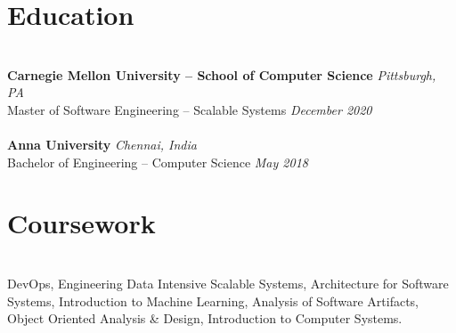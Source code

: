 \documentclass{resume}
\author{https://aravindvasu.dev}{Aravind Vasudevan}
\begin{document}
\maketitle
\section*{Education}
\titlerule
\noindent
\\
\textbf{Carnegie Mellon University -- School of Computer Science} \hfill \textit{Pittsburgh, PA} \\
{\small Master of Software Engineering -- Scalable Systems} \hfill \textit{\small December 2020}\\
\\
\textbf{Anna University} \hfill \textit{Chennai, India} \\
{\small Bachelor of Engineering -- Computer Science} \hfill \textit{\small May 2018}

\section*{Coursework}
\titlerule
\noindent
\\
DevOps, Engineering Data Intensive Scalable Systems, Architecture for Software Systems, Introduction to Machine Learning, Analysis of Software Artifacts, Object Oriented Analysis \& Design, Introduction to Computer Systems.
\end{document}
